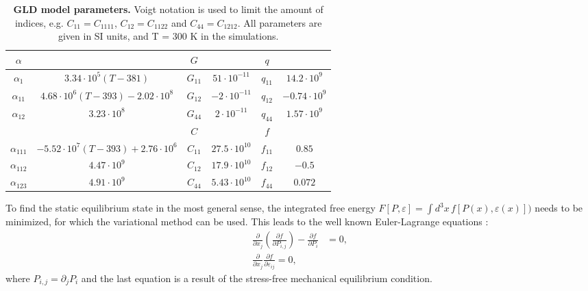 \begin{table}
\begin{tabular}{|c|c|c|c|c|c|}
	\hline
	 $\alpha$ & & $G$ & & $q$ &\\
	 \hline
	 $\alpha_1$ & $3.34\cdot 10^5 (T - 381)$  & $G_{11}$ & $51 \cdot 10^{-11}$ & $q_{11}$ & $14.2 \cdot 10^{9}$ \\
	 $\alpha_{11}$ & $4.68 \cdot 10^6 (T-393) - 2.02 \cdot 10^8$ & $G_{12}$ & $-2 \cdot 10^{-11}$ & $q_{12}$ & $-0.74 \cdot 10^{9}$ \\
	 $\alpha_{12}$ & $3.23 \cdot 10^8$ & $G_{44}$ & $2 \cdot 10^{-11}$  & $q_{44}$ & $1.57 \cdot 10^{9}$ \\
	 \cline{3-6}
	 & & $C$ & & $f$ &\\
	 \cline{3-6}
	 $\alpha_{111}$ & $-5.52 \cdot 10^7 (T - 393) + 2.76 \cdot 10^6 $ & $C_{11}$ & $27.5 \cdot 10^{10}$ & $f_{11}$ & $0.85$ \\
	 $\alpha_{112}$ &  $4.47 \cdot 10^9 $ & $C_{12}$ & $17.9 \cdot 10^{10}$ & $f_{12}$ & $-0.5$  \\
	 $\alpha_{123}$ & $4.91 \cdot 10^9$ &$C_{44}$ & $5.43 \cdot 10^{10}$ & $f_{44}$ & $ 0.072$ \\
	 \hline
\end{tabular}
\caption{{\bf GLD model parameters.} Voigt notation \cite{Voigt} is used to limit the amount of indices, e.g. $C_{11} = C_{1111}$, $C_{12} = C_{1122}$ and $C_{44}= C_{1212}$.  All parameters are given in SI units, and T = 300 K in the simulations.\label{tab:BTO_param}}
\end{table}

To find the static equilibrium state in the most general sense, the integrated free energy $F[P,\varepsilon] = \int d^3x \,f[P(x), \varepsilon(x)])$ needs to be minimized, for which the variational method can be used.
This leads to the well known Euler-Lagrange equations \cite{Cao1991, Marton2010}:
\begin{align}
	\label{eq:BTO_euler}
	\frac{\partial}{\partial x_j}\left( \frac{\partial f}{\partial P_{i,j}}\right) - \frac{\partial f}{\partial P_i} &= 0, \\
	\frac{\partial}{\partial x_j}\frac{\partial f}{\partial \varepsilon_{ij}} = 0,
\end{align}
where $P_{i,j} = \partial_j P_i$ and the last equation is a result of the stress-free mechanical equilibrium condition.

